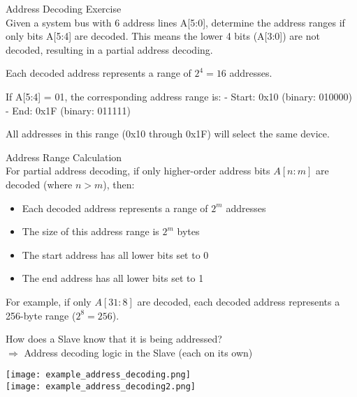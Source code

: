 \begin{example2}{Address Decoding Exercise}\\
Given a system bus with 6 address lines A[5:0], determine the address ranges if only bits A[5:4] are decoded.
\tcblower
This means the lower 4 bits (A[3:0]) are not decoded, resulting in a partial address decoding.

Each decoded address represents a range of $2^4 = 16$ addresses.

If A[5:4] = 01, the corresponding address range is:
- Start: 0x10 (binary: 010000)
- End: 0x1F (binary: 011111)

All addresses in this range (0x10 through 0x1F) will select the same device.
\end{example2}

\columnbreak

\begin{theorem}{Address Range Calculation}\\
For partial address decoding, if only higher-order address bits \(A[n:m]\) are decoded (where \(n > m\)), then:
\begin{itemize}
    \item Each decoded address represents a range of \(2^m\) addresses
    \item The size of this address range is \(2^m\) bytes
    \item The start address has all lower bits set to 0
    \item The end address has all lower bits set to 1
\end{itemize}
For example, if only \(A[31:8]\) are decoded, each decoded address represents a 256-byte range (\(2^8 = 256\)).
\end{theorem}

\begin{remark}
    How does a Slave know that it is being addressed?\\
    $\Rightarrow$ Address decoding logic in the Slave (each on its own)
\end{remark}



\begin{example}
    \texttt{[image: example\_address\_decoding.png]}\\
    \texttt{[image: example\_address\_decoding2.png]}
\end{example}



\columnbreak

